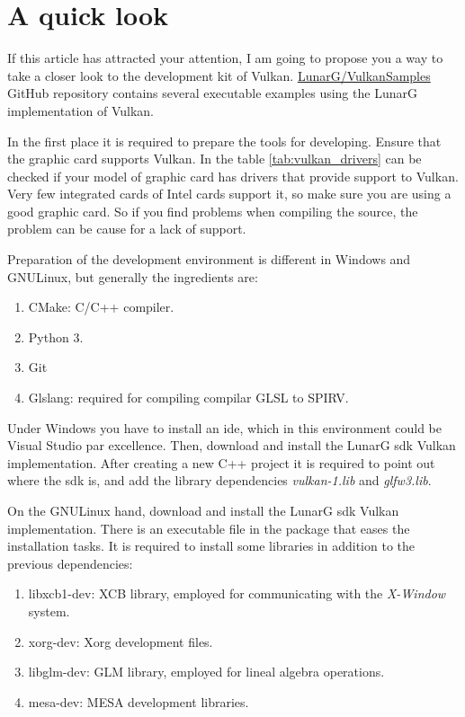 \chapter{A quick look}
If this article has attracted your attention, I am going to propose you a way to take a closer look to the development
kit of Vulkan. \href{https://github.com/LunarG/VulkanSamples}{LunarG/VulkanSamples} GitHub repository contains several
executable examples using the LunarG implementation of Vulkan.

In the first place it is required to prepare the tools for developing. Ensure that the graphic card supports Vulkan. In
the table \ref{tab:vulkan_drivers} can be checked if your model of graphic card has drivers that provide support to
Vulkan. Very few integrated cards of Intel cards support it, so make sure you are using a good graphic card. So if you
find problems when compiling the source, the problem can be cause for a lack of support.

Preparation of the development environment is different in Windows and GNU\/Linux, but generally the ingredients are:
\begin{enumerate}
    \item CMake: C/C++ compiler.
    \item Python 3.
    \item Git
    \item Glslang: required for compiling compilar \gls{GLSL} to \gls{SPIRV}.
\end{enumerate}

Under Windows you have to install an \gls{ide}, which in this environment could be Visual Studio par excellence. Then,
download and install the LunarG \gls{sdk} Vulkan implementation. After creating a new C++ project it is required to
point out where the \gls{sdk} is, and add the library dependencies \emph{vulkan-1.lib} and \emph{glfw3.lib}.

On the GNU\/Linux hand, download and install the LunarG \gls{sdk} Vulkan implementation. There is an executable file
in the package that eases the installation tasks. It is required to install some libraries in addition to the
previous dependencies:
\begin{enumerate}
    \item libxcb1-dev: XCB library, employed for communicating with the \emph{X-Window} system.
    \item xorg-dev: Xorg development files.
    \item libglm-dev: GLM library, employed for lineal algebra operations.
    \item mesa-dev: MESA development libraries.
\end{enumerate}

